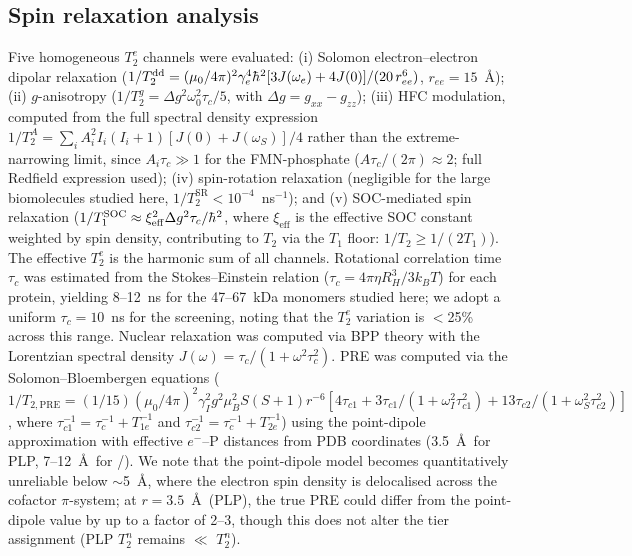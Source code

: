 \documentclass[twoside,twocolumn,9pt]{article}
\newcommand{\myhbar}{\mathchar'26\mkern-9mu h}
\begin{document}
\subsection{Spin relaxation analysis}

Five homogeneous $T_2^e$ channels were evaluated: (i) Solomon electron--electron dipolar relaxation ($1/T_2^\mathrm{dd} = (\mu_0/4\pi)^2 \gamma_e^4\myhbar^{2}[3J(\omega_e) + 4J(0)]/(20\,r_{ee}^6)$, $r_{ee} = 15$~\AA); (ii) $g$-anisotropy ($1/T_2^g = \Delta g^2\omega_0^2\tau_c/5$, with $\Delta g = g_{xx} - g_{zz}$); (iii) HFC modulation, computed from the full spectral density expression $1/T_2^A = \sum_i A_i^2 I_i(I_i+1)[J(0) + J(\omega_S)]/4$ rather than the extreme-narrowing limit, since $A_i\tau_c \gg 1$ for the FMN-phosphate ($A\tau_c/(2\pi) \approx 2$; full Redfield expression used); (iv) spin-rotation relaxation (negligible for the large biomolecules studied here, $1/T_2^\mathrm{SR} < 10^{-4}$~ns$^{-1}$); and (v) SOC-mediated spin relaxation ($1/T_1^\mathrm{SOC} \approx \xi_\mathrm{eff}^2\Delta g^2\tau_c/\myhbar^{2}$, where $\xi_\mathrm{eff}$ is the effective SOC constant weighted by spin density, contributing to $T_2$ via the $T_1$ floor: $1/T_2 \geq 1/(2T_1)$).\cite{Marian2012} The effective $T_2^e$ is the harmonic sum of all channels. Rotational correlation time $\tau_c$ was estimated from the Stokes--Einstein relation ($\tau_c = 4\pi\eta R_H^3/3k_BT$) for each protein, yielding 8--12~ns for the 47--67~kDa monomers studied here; we adopt a uniform $\tau_c = 10$~ns for the screening, noting that the $T_2^e$ variation is $<$25\% across this range. Nuclear relaxation was computed via BPP theory\cite{Abragam1961} with the Lorentzian spectral density $J(\omega) = \tau_c/(1 + \omega^2\tau_c^2)$. PRE was computed via the Solomon--Bloembergen equations\cite{Solomon1955} ($1/T_{2,\mathrm{PRE}} = (1/15)(\mu_0/4\pi)^2\gamma_I^2 g^2\mu_B^2 S(S+1) r^{-6}[4\tau_{c1} + 3\tau_{c1}/(1+\omega_I^2\tau_{c1}^2) + 13\tau_{c2}/(1+\omega_S^2\tau_{c2}^2)]$, where $\tau_{c1}^{-1} = \tau_c^{-1} + T_{1e}^{-1}$ and $\tau_{c2}^{-1} = \tau_c^{-1} + T_{2e}^{-1}$) using the point-dipole approximation with effective $e^-$--P distances from PDB coordinates (3.5~\AA\ for PLP, 7--12~\AA\ for /). We note that the point-dipole model becomes quantitatively unreliable below $\sim$5~\AA, where the electron spin density is delocalised across the cofactor $\pi$-system; at $r = 3.5$~\AA\ (PLP), the true PRE could differ from the point-dipole value by up to a factor of 2--3, though this does not alter the tier assignment (PLP $T_2^n$ remains $\ll$  $T_2^n$).
\end{document}

